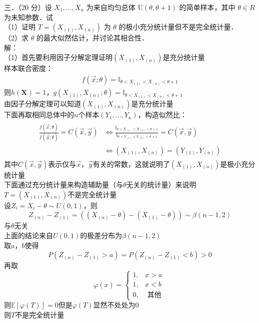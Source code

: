 \documentclass[12pt]{article}
\begin{document}
\noindent 三．（20 分）设 $X_{1}, \ldots, X_{n}$ 为来自均匀总体 $\mathrm{U}(\theta, \theta+1)$ 的简单样本，其中 $\theta \in R$ 为未知参数．试\\
（1）证明 $T=\left(X_{(1)}, X_{(n)}\right)$ 为 $\theta$ 的极小充分统计量但不是完全统计量．\\
（2）求 $\theta$ 的最大似然估计，并讨论其相合性．\\
解：\\
（1）首先要利用因子分解定理证明$(X_{(1)},X_{(n)})$是充分统计量\\
样本联合密度：\\
\begin{gather}
f(\vec{x};\theta) = \mathbb{I}_{\theta < X_{(1)} < X_{(n)} < \theta + 1}
\end{gather}
则$h(\boldsymbol{X})=1$，$g(X_{(1)},X_{(n)};\theta)=\mathbb{I}_{\theta < X_{(1)} < X_{(n)} < \theta + 1}$\\
由因子分解定理可以知道$(X_{(1)},X_{(n)})$是充分统计量\\
下面再取相同总体中的$n$个样本$(Y_1,\dots,Y_n)$，构造似然比：
\begin{gather}
\begin{aligned}
	\frac{f(\vec{x};\theta)}{f(\vec{y};\theta)}=C(\vec{x},\vec{y})& \iff \frac{\mathbb{I}_{\theta < X_{(1)} < X_{(n)} < \theta + 1}}{\mathbb{I}_{\theta < Y_{(1)} < Y_{(n)} < \theta + 1}}=C(\vec{x},\vec{y}) \\
	&\iff (X_{(1)},X_{(n)})=(Y_{(1)},Y_{(n)})
\end{aligned}
\end{gather}
其中$C(\vec{x},\vec{y})$表示仅与$\vec{x}$，$\vec{y}$有关的常数，这就说明了$(X_{(1)},X_{(n)})$是极小充分统计量\\
下面通过充分统计量来构造辅助量（与$\theta$无关的统计量）来说明$T=(X_{(1)},X_{(n)})$不是完全统计量\\
设$Z_i=X_i-\theta \sim U(0,1)$，则
$$Z_{(n)}-Z_{(1)}=((X_{(n)}-\theta)-(X_{(1)}-\theta)) \sim \beta(n-1,2)$$
与$\theta$无关\\
上面的结论来自$U(0,1)$的极差分布为$\beta(n-1,2)$\\
取$a$，$b$使得
$$P(Z_{(n)}-Z_{(1)}>a)=P(Z_{(n)}-Z_{(1)}<b)>0$$
再取
$$\varphi(x)= \begin{cases}1, & x>a \\ 1, & x<b \\ 0, & \text { 其他 }\end{cases}$$
则$\mathbb{E}[\varphi(T)]=0$但是$\varphi(T)$显然不处处为$0$\\
则$T$不是完全统计量\\
\end{document}
